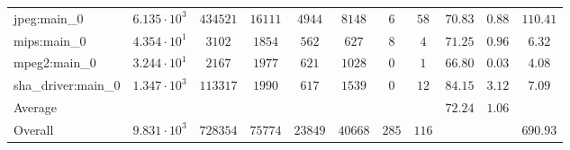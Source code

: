 \begin{tabular}{|l|c|c|c|c|c|c|c|c|c|c|}
jpeg:main\_0            & $ 6.135 \cdot 10^{3} $ & $ 434521 $ & $ 16111 $ & $ 4944  $ & $ 8148  $ & $ 6   $ & $ 58  $ & $ 70.83       $ & $ 0.88    $ & $ 110.41  $ \\
mips:main\_0            & $ 4.354 \cdot 10^{1} $ & $ 3102   $ & $ 1854  $ & $ 562   $ & $ 627   $ & $ 8   $ & $ 4   $ & $ 71.25       $ & $ 0.96    $ & $ 6.32    $ \\
mpeg2:main\_0           & $ 3.244 \cdot 10^{1} $ & $ 2167   $ & $ 1977  $ & $ 621   $ & $ 1028  $ & $ 0   $ & $ 1   $ & $ 66.80       $ & $ 0.03    $ & $ 4.08    $ \\
sha\_driver:main\_0     & $ 1.347 \cdot 10^{3} $ & $ 113317 $ & $ 1990  $ & $ 617   $ & $ 1539  $ & $ 0   $ & $ 12  $ & $ 84.15       $ & $ 3.12    $ & $ 7.09    $ \\
\hline
Average                 & $                    $ & $        $ & $       $ & $       $ & $       $ & $     $ & $     $ & $ 72.24       $ & $ 1.06    $ & $         $ \\
\hline
Overall                 & $ 9.831 \cdot 10^{3} $ & $ 728354 $ & $ 75774 $ & $ 23849 $ & $ 40668 $ & $ 285 $ & $ 116 $ & $             $ & $         $ & $ 690.93  $ \\
\hline
\end{tabular}

